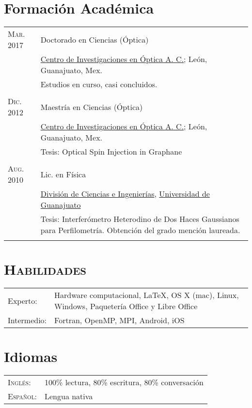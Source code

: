 \documentclass[letterpaper,10pt]{article}
\begin{document}
\section{Formaci\'on Acad\'emica}
\begin{tabular}{R{4cm}|p{11cm}}
\textsc{Mar. 2017 } &   Doctorado en Ciencias (\'Optica) \\
                        &   \href{http://www.cio.mx/}{Centro de Investigaciones en \'Optica A. C.}; Le\'on, Guanajuato, Mex.\\
                        &   Estudios en curso, casi concluidos.\\
                     \\

\textsc{Dic. 2012 } &   Maestr\'ia en Ciencias (\'Optica) \\
                        &   \href{http://www.cio.mx/}{Centro de Investigaciones en \'Optica A. C.}; Le\'on, Guanajuato, Mex.\\
                        &   Tesis: Optical Spin Injection in Graphane\\
                     \\

\textsc{Aug. 2010 } &   Lic. en F\'isica \\
                        &   \href{https://fisica.ugto.mx}{Divisi\'on de Ciencias e Ingenier\'ias}, \href{http://www.ugto.mx}{Universidad de Guanajuato}\\
                        &   Tesis: Interfer\'ometro Heterodino de Dos Haces Gaussianos para Perfilometr\'ia. Obtenci\'on del grado menci\'on laureada.\\
                     \\
\end{tabular}

\section{\textsc{Habilidades}}
    \begin{tabular}{R{4cm} p{10cm}}
        Experto:    &   Hardware computacional, \LaTeX, OS X (mac), Linux, Windows, Paquetería Office y Libre Office\\ 
        Intermedio: &   Fortran, OpenMP, MPI, Android, iOS\\
    \end{tabular}

\section{Idiomas}
    \begin{tabular}{R{4cm}l}
        \textsc{Ingl\'es}:  &   100\% lectura, 80\% escritura, 80\% conversación \\
        \textsc{Espa\~nol}: &   Lengua nativa \\
    \end{tabular}
\end{document}
